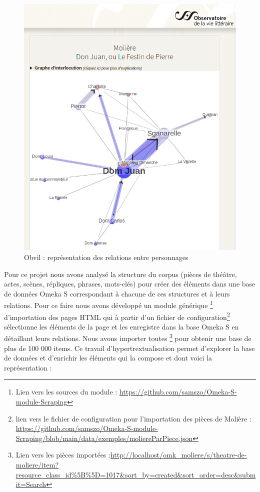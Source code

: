 \documentclass[
  a4paper,
  DIV=11,
  numbers=noendperiod]{scrreprt}
\begin{document}
\begin{figure}

{\centering \includegraphics{images/obvil_corpus_moliere_moliere_dom-juan-1682.png}

}

\caption{Obvil : représentation des relations entre personnages}

\end{figure}%

Pour ce projet nous avons analysé la structure du corpus (pièces de
théâtre, actes, scènes, répliques, phrases, mots-clés) pour créer des
éléments dans une base de données Omeka S correspondant à chacune de ces
structures et à leurs relations. Pour ce faire nous avons développé un
module générique \footnote{Lien vers les sources du module :
  \url{https://github.com/samszo/Omeka-S-module-Scraping}} d'importation
des pages HTML qui à partir d'un fichier de configuration\footnote{lien
  vers le fichier de configuration pour l'importation des pièces de
  Molière :
  \url{https://github.com/samszo/Omeka-S-module-Scraping/blob/main/data/exemples/moliereParPiece.json}}
sélectionne les éléments de la page et les enregistre dans la base Omeka
S en détaillant leurs relations. Nous avons importer toutes \footnote{Lien
  vers les pièces importées
  :\url{http://localhost/omk_moliere/s/theatre-de-moliere/item?resource_class_id\%5B\%5D=1017&sort_by=created&sort_order=desc&submit=Search}}
pour obtenir une base de plus de 100 000 items. Ce travail
d'hypertrextualisation permet d'explorer la base de données et
d'enrichir les éléments qui la compose et dont voici la représentation :
\end{document}
